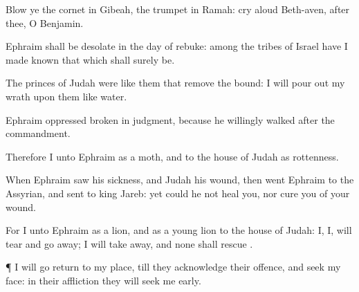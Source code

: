 {\par }{\PP {}Blow ye the
cornet in
Gibeah,
{} the
trumpet in
Ramah: cry
aloud
{}
Beth-aven,
after thee, O
Benjamin.

Ephraim shall be
desolate in the
day of
rebuke: among the
tribes of
Israel have I made
known that which shall surely
be.

The
princes of
Judah were like them that
remove the
bound:
{} I will pour
out my
wrath upon them like
water.

Ephraim
{}
oppressed
{}
broken in
judgment, because he
willingly
walked
after the
commandment.

Therefore
{} I
{} unto
Ephraim as a
moth, and to the
house of
Judah as
rottenness.

When
Ephraim
saw his
sickness, and
Judah
{} his
wound, then
went
Ephraim to the
Assyrian, and
sent to
king
Jareb: yet
could he not
heal you, nor
cure you of your
wound.

For I
{} unto
Ephraim as a
lion, and as a young
lion to the
house of
Judah: I,
{} I, will
tear and go
away; I will take
away, and none shall
rescue
{}.


\par }{\PP {}¶ I will
go
{}
return to my
place, till they acknowledge their
offence, and
seek my
face: in their
affliction they will seek me
early.




\par }
